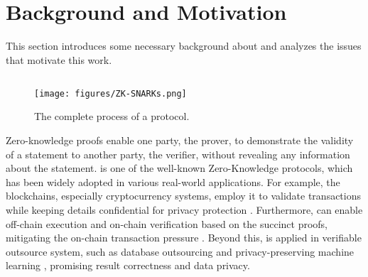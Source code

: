 \section{Background and Motivation} \label{sec:background}

This section introduces some necessary background about \zk and analyzes the issues that motivate this work. 







\subsection{{\zk}} \label{subsec:zk}

\begin{figure}[t]
    \centering
    \texttt{[image: figures/ZK-SNARKs.png]}
    \caption{The complete process of a \zk protocol.}
    \label{fig:zk-snarks}
    \vspace{10pt}
\end{figure}

Zero-knowledge proofs enable one party, the prover, to demonstrate the validity of a statement to another party, the verifier, without revealing any information about the statement.
\zk \cite{bitansky2013succinct, chiesa2020marlin} is one of the well-known Zero-Knowledge protocols, which has been widely adopted in various real-world applications. For example, the blockchains, especially cryptocurrency systems, employ it to validate transactions while keeping details confidential for privacy protection \cite{sasson2014zerocash,danezis2013pinocchio,filecoin2022,quorum2022,guo2024zkcross,kosba2016hawk,mina2022,qedit2017}.
Furthermore, {\zk} can enable off-chain execution and on-chain verification based on the succinct proofs, mitigating the on-chain transaction pressure \cite{xie2022zkbridge,mina2022,xu2024exploring}.
Beyond this, \zk is applied in verifiable outsource system\cite{wahby2014efficient,costello2015geppetto,delignat2016cinderella}, such as database outsourcing \cite{li2023zksql,zhang2017zero} and privacy-preserving machine learning \cite{liu2021zkcnn,chen2024zkml}, promising result correctness and data privacy.

 
 
